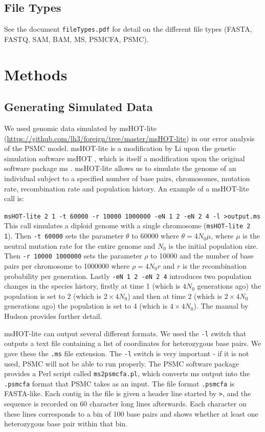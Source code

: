 \documentclass[11pt,a4paper]{article}
\begin{document}
\subsection{File Types}
See the document \verb|fileTypes.pdf| for detail on the different file types (FASTA, FASTQ, SAM, BAM, MS, PSMCFA, PSMC).


\section{Methods}\label{sec:methods}
\subsection{Generating Simulated Data} %
We used genomic data simulated by msHOT-lite (\url{https://github.com/lh3/foreign/tree/master/msHOT-lite}) in our error analysis of the PSMC model. msHOT-lite is a modification by Li upon the genetic simulation software msHOT \cite{hellenthal2007mshot}, which is itself a modification upon the original software package ms \cite{hudson2002generating}. msHOT-lite allows us to simulate the genome of an individual subject to a specified number of base pairs, chromosomes, mutation rate, recombination rate and population history. 
An example of a msHOT-lite call is: 

\verb|msHOT-lite 2 1 -t 60000 -r 10000 1000000 -eN 1 2 -eN 2 4 -l >output.ms| 
This call simulates a diploid genome with a single chromosome (\verb|msHOT-lite 2 1|). Then \verb|-t 60000| sets the parameter $\theta$ to 60000 where $\theta=4N_0\mu$, where $\mu$ is the neutral mutation rate for the entire genome and $N_0$ is the initial population size. Then \verb|-r 10000 1000000| sets the parameter $\rho$ to 10000 and the number of base pairs per chromosome to 1000000 where $\rho=4N_0r$ and $r$ is the recombination probability per generation. Lastly \verb|-eN 1 2 -eN 2 4| introduces two population changes in the species history, firstly at time 1 (which is $4N_0$ generations ago) the population is set to 2 (which is $2\times4N_0$) and then at time 2 (which is $2\times4N_0$ generations ago) the population is set to 4 (which is $4\times4N_0$). The manual by Hudson \cite{hudson2002generating} provides further detail.

msHOT-lite can output several different formats. We used the \verb|-l| switch that outputs a text file containing a list of coordinates for heterozygous base pairs. We gave these the \verb|.ms| file extension. The \verb|-l| switch is very important - if it is not used, PSMC will not be able to run properly. The PSMC software package provides a Perl script called \verb|ms2psmcfa.pl|, which converts ms output into the \verb|.psmcfa| format that PSMC takes as an input. The file format \verb|.psmcfa| is FASTA-like. Each contig in the file is given a header line started by \verb|>|, and the sequence is recorded on 60 character long lines afterwards. Each character on these lines corresponds to a bin of 100 base pairs and shows whether at least one heterozygous base pair within that bin.
\end{document}
